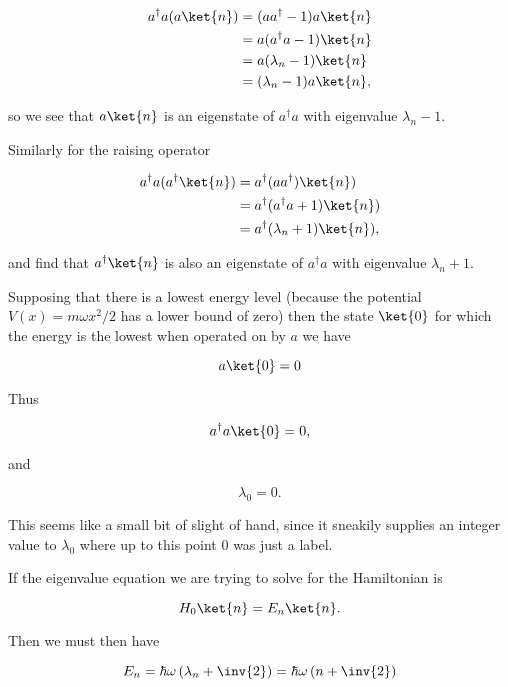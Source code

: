 \begin{align*}
a^\dagger a ( a \ket{n} )
&= (a a^\dagger - 1 ) a \ket{n} \\
&= a (a^\dagger a - 1 ) \ket{n} \\
&= a (\lambda_n - 1 ) \ket{n} \\
&= (\lambda_n - 1 ) a \ket{n},
\end{align*}

so we see that $a \ket{n}$ is an eigenstate of $a^\dagger a$ with eigenvalue $\lambda_n - 1$.

Similarly for the raising operator

\begin{align*}
a^\dagger a ( a^\dagger \ket{n} )
&=
a^\dagger (a  a^\dagger) \ket{n} ) \\
&=
a^\dagger (a^\dagger a + 1) \ket{n} ) \\
&=
a^\dagger (\lambda_n + 1) \ket{n} ),
\end{align*}

and find that $a^\dagger \ket{n}$ is also an eigenstate of $a^\dagger a$ with eigenvalue $\lambda_n + 1$.

Supposing that there is a lowest energy level (because the potential $V(x) = m \omega x^2 /2$ has a lower bound of zero) then the state $\ket{0}$ for which the energy is the lowest when operated on by $a$ we have

\begin{equation}\label{eqn:phy456ps1:220}
a \ket{0} = 0
\end{equation}

Thus

\begin{equation}\label{eqn:phy456ps1:240}
a^\dagger a \ket{0} = 0,
\end{equation}

and

\begin{equation}\label{eqn:phy456ps1:260}
\lambda_0 = 0.
\end{equation}

This seems like a small bit of slight of hand, since it sneakily supplies an integer value to $\lambda_0$ where up to this point $0$ was just a label.

If the eigenvalue equation we are trying to solve for the Hamiltonian is

\begin{equation}\label{eqn:phy456ps1:280}
H_0 \ket{n} = E_n \ket{n}.
\end{equation}

Then we must then have

\begin{equation}\label{eqn:phy456ps1:300}
E_n = \hbar \omega \left(\lambda_n + \inv{2} \right) = \hbar \omega \left(n + \inv{2} \right)
\end{equation}
